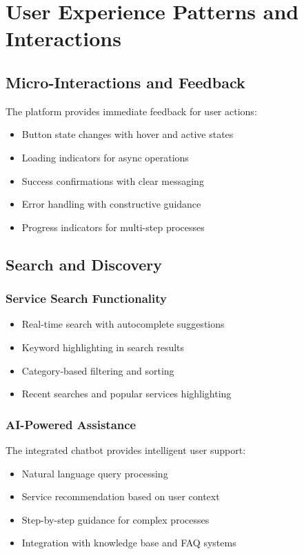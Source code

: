 \documentclass[12pt,a4paper]{article}
\begin{document}
\section{User Experience Patterns and Interactions}

\subsection{Micro-Interactions and Feedback}

The platform provides immediate feedback for user actions:

\begin{itemize}
    \item Button state changes with hover and active states
    \item Loading indicators for async operations
    \item Success confirmations with clear messaging
    \item Error handling with constructive guidance
    \item Progress indicators for multi-step processes
\end{itemize}

\subsection{Search and Discovery}

\subsubsection{Service Search Functionality}
\begin{itemize}
    \item Real-time search with autocomplete suggestions
    \item Keyword highlighting in search results
    \item Category-based filtering and sorting
    \item Recent searches and popular services highlighting
\end{itemize}

\subsubsection{AI-Powered Assistance}

The integrated chatbot provides intelligent user support:

\begin{itemize}
    \item Natural language query processing
    \item Service recommendation based on user context
    \item Step-by-step guidance for complex processes
    \item Integration with knowledge base and FAQ systems
\end{itemize}
\end{document}
